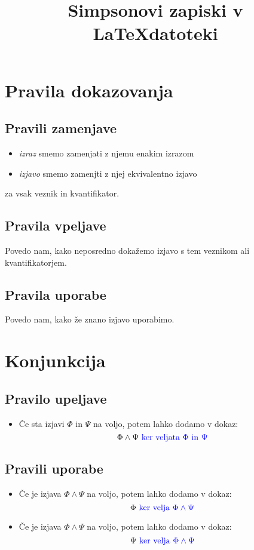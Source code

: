 \documentclass[12pt,a4paper]{article}
\title{Simpsonovi zapiski v \LaTeX  \space  datoteki}
\newcommand{\blue}[1]{\textcolor{blue}{#1}}
\begin{document}
\maketitle

\newpage





\section{Pravila dokazovanja}
    \subsection*{Pravili zamenjave}
    \begin{itemize}
        \item \emph{izraz} smemo zamenjati z njemu enakim izrazom
        \item \emph{izjavo} smemo zamenjti z njej ekvivalentno izjavo
    \end{itemize}
    za vsak veznik in kvantifikator.

    \subsection*{Pravila vpeljave}
    Povedo nam, kako neposredno dokažemo izjavo s tem veznikom ali kvantifikatorjem.

    \subsection*{Pravila uporabe}
    Povedo nam, kako že znano izjavo uporabimo. 

\section{Konjunkcija}
    \subsection*{Pravilo upeljave}
        \begin{itemize}
            \item Če sta izjavi $ \Phi $ in $ \Psi $ na voljo, potem lahko dodamo v dokaz:
            $$  \Phi \wedge \Psi \blue{\text{ ker veljata }  \Phi  \text{ in } \Psi}  $$
        \end{itemize}

    \subsection*{Pravili uporabe}
    \begin{itemize}
        \item Če je izjava $ \Phi \wedge \Psi $ na voljo, potem lahko dodamo v dokaz:
        $$ \Phi \blue{\text{ ker velja } \Phi \wedge \Psi } $$
        \item Če je izjava $ \Phi \wedge \Psi $ na voljo, potem lahko dodamo v dokaz:
        $$ \Psi \blue{\text{ ker velja } \Phi \wedge \Psi } $$
    \end{itemize}
\end{document}
